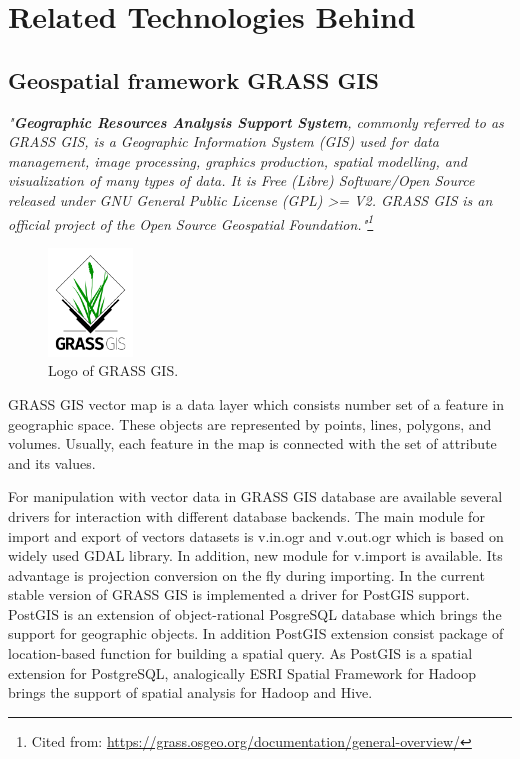 \documentclass[a4paper,12pt,oneside]{report}
\begin{document}
	
	\section{Related Technologies Behind}
	\subsection{Geospatial framework GRASS GIS}
	
	\textit{"\textbf{Geographic Resources Analysis Support System}, 
		commonly referred to as GRASS GIS, is a Geographic Information System (GIS) used
		for data management, image processing, graphics production, 
		spatial modelling, and visualization of many types of data. It is Free (Libre)
		Software/Open Source released under GNU General Public License 
		(GPL) >= V2. GRASS GIS is an official project of the Open Source Geospatial
		Foundation."\footnote{Cited from:
			\url{https://grass.osgeo.org/documentation/general-overview/}}}
	
	\begin{figure}[!htbp]
		\centering
		\includegraphics[width=0.2\textwidth]{./img/grasslogo.png}
		\caption[Logo GRASS]{\centering Logo of GRASS GIS.}
	\end{figure}   
	GRASS GIS vector map is a data layer which consists number set of a feature in
	geographic space. These objects are represented by points, lines, polygons, and volumes. Usually,
	each feature in the map is  connected with the set of attribute and its values.
	
	For manipulation with vector data in GRASS GIS database are available several drivers for interaction with different database backends. The main module for import and export of vectors datasets is
	v.in.ogr and v.out.ogr which is based on widely used GDAL library. In addition, new module for v.import is available. Its advantage is projection conversion on the fly during importing.
	In the current stable version of GRASS GIS is implemented a driver for PostGIS
	support. PostGIS is an extension of object-rational PosgreSQL database which brings the support for
	geographic objects. In addition PostGIS extension consist package of 
	location-based function for building a spatial query.  
	As PostGIS is a spatial extension for PostgreSQL, analogically ESRI Spatial
	Framework for Hadoop brings the support of spatial analysis for Hadoop and  Hive.
	
\end{document}
